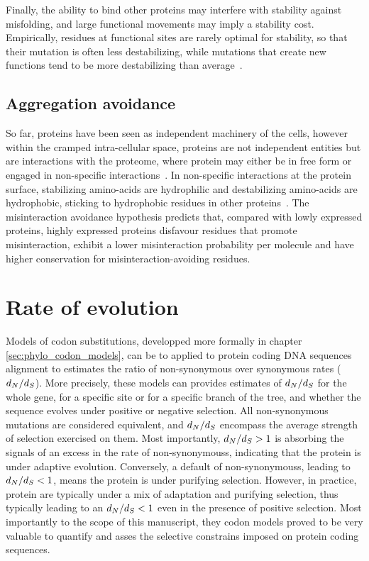 Finally, the ability to bind other proteins may interfere with stability against misfolding, and large functional movements may imply a stability cost.
Empirically, residues at functional sites are rarely optimal for stability, so that their mutation is often less destabilizing, while mutations that create new functions tend to be more destabilizing than average~\citep{Chi2016}.

\subsection{Aggregation avoidance}

So far, proteins have been seen as independent machinery of the cells, however within the cramped intra-cellular space, proteins are not independent entities but are interactions with the proteome, where protein may either be in free form or engaged in non-specific interactions~\citep{Yang2012, Zhang2013}.
In non-specific interactions at the protein surface, stabilizing amino-acids are hydrophilic and destabilizing amino-acids are hydrophobic, sticking to hydrophobic residues in other proteins~\citep{Dixit2013,Manhart2015}.
The misinteraction avoidance hypothesis predicts that, compared with lowly expressed proteins, highly expressed proteins disfavour residues that promote misinteraction, exhibit a lower misinteraction probability per molecule and have higher conservation for misinteraction-avoiding residues.

\section{Rate of evolution}
\label{sec-intro:rate-evolution}

Models of \gls{codon} \glspl{substitution}, developped more formally in chapter \ref{sec:phylo_codon_models}, can be to applied to protein coding \acrshort{DNA} sequences alignment to estimates the ratio of non-synonymous over \gls{synonymous} rates ($d_N / d_S$).
More precisely, these models can provides estimates of $d_N / d_S$ for the whole gene, for a specific site or for a specific branch of the tree, and whether the sequence evolves under positive or negative selection.
All non-synonymous mutations are considered equivalent, and $d_N / d_S$ encompass the average strength of selection exercised on them.
Most importantly, $d_N / d_S>1$ is absorbing the signals of an excess in the rate of \glspl{non-synonymous}, indicating that the protein is under adaptive evolution.
Conversely, a default of \glspl{non-synonymous}, leading to $d_N / d_S<1$, means the protein is under purifying selection.
However, in practice, protein are typically under a mix of adaptation and purifying selection, thus typically leading to an $d_N / d_S<1$ even in the presence of positive selection.
Most importantly to the scope of this manuscript, they \gls{codon} models proved to be very valuable to quantify and asses the selective constrains imposed on protein coding sequences.

